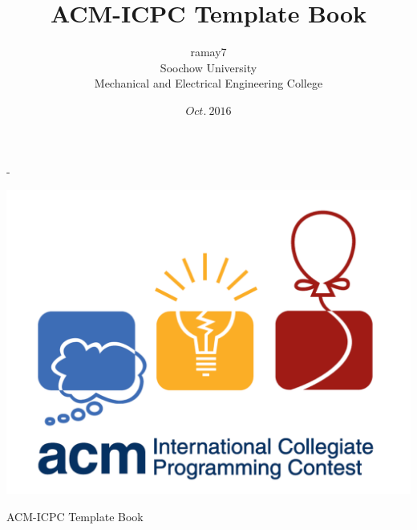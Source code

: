 



-\\
\vspace{80pt}
\begin{center}
\includegraphics[height = 10cm,width = 15cm]{acm.png}
\end{center}
\vspace{80pt}
\begin{center}
\Huge {ACM-ICPC Template Book} \\
\end{center}
\thispagestyle{empty}
\vspace{50pt}

\begin{titlepage}
\title{\huge {ACM-ICPC Template Book}}
\author{ramay7 \\[15pt]
Soochow University\\[10pt]
Mechanical and Electrical Engineering College}  %
\date{$Oct.\ 2016$}  %
\end{titlepage}
\thispagestyle{empty} %
\maketitle

\tableofcontents %












